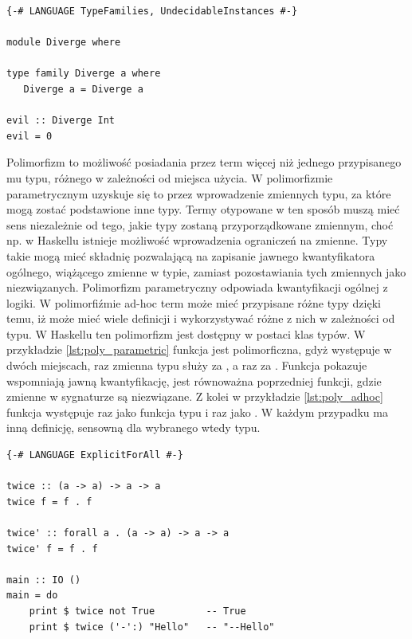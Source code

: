 \begin{lstlisting}[float,label={lst:types_diverge},
                   caption={Przykład programu, dla którego statyczne sprawdzanie typów w GHC się nie zakończy.}]
{-# LANGUAGE TypeFamilies, UndecidableInstances #-}

module Diverge where

type family Diverge a where
   Diverge a = Diverge a

evil :: Diverge Int
evil = 0
\end{lstlisting}


Polimorfizm to możliwość posiadania przez term więcej niż jednego przypisanego mu typu, różnego w zależności od miejsca użycia. W polimorfizmie parametrycznym uzyskuje się to przez wprowadzenie zmiennych typu, za które mogą zostać podstawione inne typy. Termy otypowane w ten sposób muszą mieć sens niezależnie od tego, jakie typy zostaną przyporządkowane zmiennym, choć np. w Haskellu istnieje możliwość wprowadzenia ograniczeń na zmienne. Typy takie mogą mieć składnię pozwalającą na zapisanie jawnego kwantyfikatora ogólnego, wiążącego zmienne w typie, zamiast pozostawiania tych zmiennych jako niezwiązanych. Polimorfizm parametryczny odpowiada kwantyfikacji ogólnej z logiki. W polimorfiźmie ad-hoc term może mieć przypisane różne typy dzięki temu, iż może mieć wiele definicji i wykorzystywać różne z nich w zależności od typu. W Haskellu ten polimorfizm jest dostępny w postaci klas typów\cite{TAPL}. W przykładzie \ref{lst:poly_parametric} funkcja  jest polimorficzna, gdyż występuje w dwóch miejscach, raz zmienna typu  służy za , a raz za . Funkcja  pokazuje wspomniają jawną kwantyfikację, jest równoważna poprzedniej funkcji, gdzie zmienne w sygnaturze są niezwiązane. Z kolei w przykładzie \ref{lst:poly_adhoc} funkcja  występuje raz jako funkcja typu  i raz jako . W każdym przypadku ma inną definicję, sensowną dla wybranego wtedy typu.

\begin{lstlisting}[float,label={lst:poly_parametric},
                   caption={Przykład użycia polimorfizmu parametrycznego w Haskellu.}]
{-# LANGUAGE ExplicitForAll #-}

twice :: (a -> a) -> a -> a
twice f = f . f

twice' :: forall a . (a -> a) -> a -> a
twice' f = f . f

main :: IO ()
main = do
    print $ twice not True         -- True
    print $ twice ('-':) "Hello"   -- "--Hello"
\end{lstlisting}

